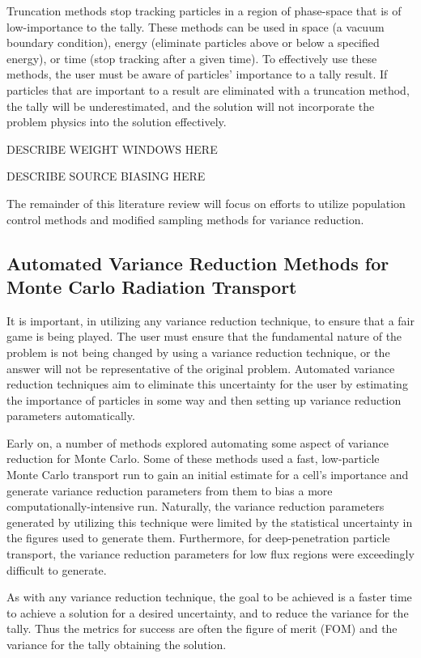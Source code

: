 Truncation methods stop tracking particles in a region of phase-space that is of
low-importance to the tally. These methods can be used in space (a vacuum boundary
condition), energy (eliminate particles above or below a specified energy), or
time (stop
tracking after a given time). To effectively use these methods, the user must be
aware of
particles' importance to a tally result. If particles that are important to a
result are
 eliminated with a truncation method, the tally will be underestimated, and the
 solution
  will not incorporate the problem physics into the solution effectively.

DESCRIBE WEIGHT WINDOWS HERE

DESCRIBE SOURCE BIASING HERE

The remainder of this literature review will focus on efforts to utilize population
control methods and modified sampling methods for variance reduction.

\subsection{Automated Variance Reduction Methods for Monte Carlo Radiation
Transport}
\label{subsec:AutomatedMCVR}

It is important, in utilizing any variance reduction technique, to ensure that a
fair game
is being played. The user must ensure that the fundamental nature of the problem
is not
being changed by using a variance reduction technique, or the answer will not be
representative of the original problem. Automated variance reduction techniques aim to
eliminate this uncertainty for the user by estimating the importance of
particles in some
 way and then setting up variance reduction parameters automatically.

Early on, a number of methods explored automating some aspect of variance
reduction for
Monte Carlo. Some of these methods used a fast, low-particle Monte Carlo
transport run to gain an initial estimate for a cell's importance and generate
variance reduction parameters from them to bias a more computationally-intensive
run. Naturally, the variance reduction parameters generated by utilizing this
technique were limited by the statistical uncertainty in the figures used to
generate them. Furthermore, for deep-penetration particle transport, the
variance reduction parameters for low flux regions were exceedingly difficult to
generate.

As with any variance reduction technique, the goal to be achieved is a faster
time to achieve a solution for a desired uncertainty, and to reduce the variance
for the tally.
Thus the metrics for success are often the figure of merit (FOM) and the
variance for the tally obtaining the solution.
